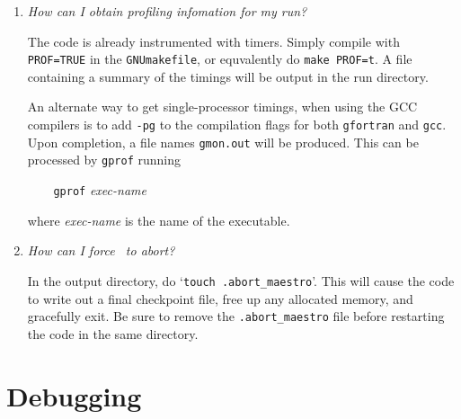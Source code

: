 \begin{enumerate}
\item {\em How can I obtain profiling infomation for my run?}

  The code is already instrumented with timers.  Simply compile with
  {\tt PROF=TRUE} in the {\tt GNUmakefile}, or equvalently do 
  {\tt make PROF=t}.  A file containing a summary of the timings will
  be output in the run directory.

  An alternate way to get single-processor timings, when using 
  the GCC compilers is to add {\tt -pg} to the compilation flags
  for both {\tt gfortran} and {\tt gcc}.  Upon completion, a
  file names {\tt gmon.out} will be produced.  This can be 
  processed by {\tt gprof} running 

  {\tt~~~ gprof} {\em exec-name}
  
  where {\em exec-name} is the name of the executable.

\item{\em How can I force \maestro\ to abort?}

  In the output directory, do `{\tt touch .abort\_maestro}'.  This 
  will cause the code to write out a final checkpoint file, free up
  any allocated memory, and gracefully exit.  Be sure to remove the 
  {\tt .abort\_maestro} file before restarting the code in the 
  same directory.



\end{enumerate}


\section{Debugging}

